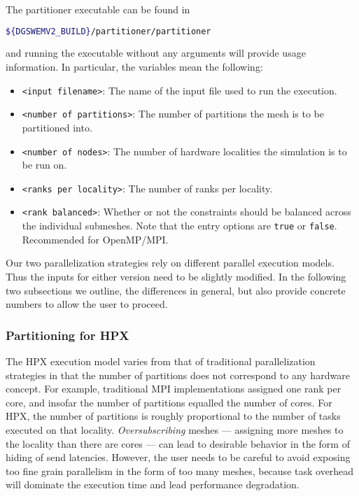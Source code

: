 The partitioner executable can be found in
\begin{lstlisting}[language=bash]
${DGSWEMV2_BUILD}/partitioner/partitioner
\end{lstlisting}
and running the executable without any arguments will provide usage information. In particular, the variables mean the following:
\begin{itemize}
\item \lstinline{<input filename>}: The name of the input file used to run the execution.
\item \lstinline{<number of partitions>}: The number of partitions the mesh is to be partitioned into.
\item \lstinline{<number of nodes>}: The number of hardware localities the simulation is to be run on.
\item \lstinline{<ranks per locality>}: The number of ranks per locality. 
\item \lstinline{<rank balanced>}: Whether or not the constraints should be balanced across the individual submeshes. Note that the entry options are \lstinline{true} or \lstinline{false}. Recommended for OpenMP/MPI.
\end{itemize}
Our two parallelization strategies rely on different parallel execution models. Thus the inputs for either version need to be slightly modified. In the following two subsections we outline, the differences in general, but also provide concrete numbers to allow the user to proceed.
\subsubsection{Partitioning for HPX}
The HPX execution model varies from that of traditional parallelization strategies in that the number of partitions does not correspond to any hardware concept. For example, traditional MPI implementations assigned one rank per core, and insofar the number of partitions equalled the number of cores. For HPX, the number of partitions is roughly proportional to the number of tasks executed on that locality. \emph{Oversubscribing} meshes --- assigning more meshes to the locality than there are cores --- can lead to desirable behavior in the form of hiding of send latencies. However, the user needs to be careful to avoid exposing too fine grain parallelism in the form of too many meshes, because task overhead will dominate the execution time and lead performance degradation.

